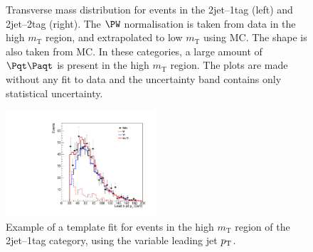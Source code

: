 \begin{figure}
\begin{center}

\end{center}
\caption{
Transverse mass distribution for events in the 2jet--1tag (left) and
2jet--2tag (right). The $\PW$ normalisation is taken from data in the high
$m_{\text{T}}$ region, and extrapolated to low $m_{\text{T}}$ using \ac{MC}. The
shape is also taken from \ac{MC}. In these categories, a large amount of
$\ttbar$ is present in the high $m_{\text{T}}$ region. The plots are made without any
fit to data and the uncertainty band contains only statistical uncertainty.}
\label{fig:2jet1tag2jet2tagmt}
\end{figure}


\begin{figure}
\begin{center}
    \includegraphics[width=0.5\textwidth]
      {plots/Hhh/W_TT_fit_prebjetpt_1_2jet1tag.pdf}

\end{center}
\caption{
Example of a template fit for events in the high $m_{\text{T}}$ region of the
2jet--1tag category, using the variable leading jet $p_{\mathrm{T}}$. }
\label{fig:2jet1tag2jet2tagmt}
\end{figure}

